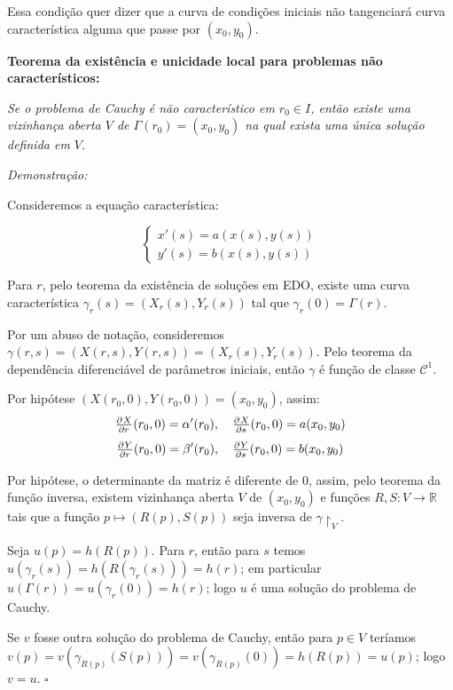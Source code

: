 \documentclass[11pt,twoside,a4paper]{book}
\begin{document}
\smallskip
\noindent
Essa condição quer dizer que a curva de condições iniciais não tangenciará curva característica alguma que passe por $(x_0,y_0)$.

\bigskip
\noindent
\textbf{Teorema da existência e unicidade local para problemas não característicos:}

\noindent
\textit{Se o problema de Cauchy é não característico em $r_0\in I$, então existe uma vizinhança aberta $V$ de $\Gamma(r_0)=(x_0,y_0)$ na qual exista uma única solução definida em $V$.}

\smallskip
\noindent
\textit{Demonstração:}

\noindent
Consideremos a equação característica:

\begin{equation*}
    \begin{cases}
    x'(s)=a(x(s),y(s)) \\
    y'(s)=b(x(s),y(s))
    \end{cases}
\end{equation*}

\smallskip
\noindent
Para $r$, pelo teorema da existência de soluções em EDO, existe uma curva característica $\gamma_r(s)=(X_r(s),Y_r(s))$ tal que $\gamma_r(0)=\Gamma(r)$.

\smallskip
\noindent
Por um abuso de notação, consideremos $\gamma(r,s)=(X(r,s),Y(r,s))=(X_r(s),Y_r(s))$. Pelo teorema da dependência diferenciável de parâmetros iniciais, então $\gamma$ é função de classe $\mathcal{C}^1$.


\smallskip
\noindent
Por hipótese $\left(X\left(r_0,0\right),Y\left(r_0,0\right)\right)=(x_0,y_0)$, assim:
\[
\pd{X}{r}(r_0,0)=\alpha'(r_0),\quad \pd{X}{s}(r_0,0)=a(x_0,y_0)
\]
\[
\pd{Y}{r}(r_0,0)=\beta'(r_0),\quad \pd{Y}{s}(r_0,0)=b(x_0,y_0)
\]

\noindent
Por hipótese, o determinante da matriz é diferente de $0$, assim, pelo teorema da função inversa, existem vizinhança aberta $V$ de $(x_0,y_0)$ e funções $R,S:V\rightarrow\mathbb{R}$ tais que a função $p\mapsto(R(p),S(p))$ seja inversa de $\gamma\upharpoonright_V$.

\smallskip
\noindent
Seja $u(p)=h(R(p))$. Para $r$, então para $s$ temos $u(\gamma_r(s))=h(R(\gamma_r(s)))=h(r)$; em particular $u(\Gamma(r))=u(\gamma_r(0))=h(r)$; logo $u$ é uma solução do problema de Cauchy.

\smallskip
\noindent
Se $v$ fosse outra solução do problema de Cauchy, então para $p\in V$ teríamos $v(p)=v(\gamma_{R(p)}(S(p)))=v(\gamma_{R(p)}(0))=h(R(p))=u(p)$; logo $v=u$. $\square$
\end{document}
